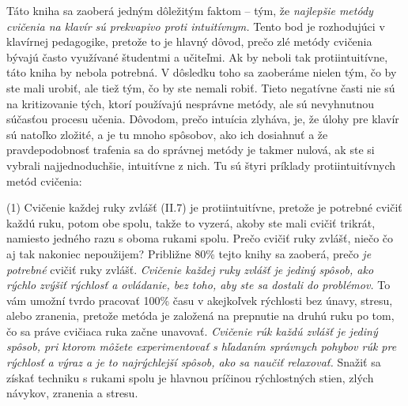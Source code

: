 Táto kniha sa zaoberá jedným dôležitým faktom – tým, že \emph{najlepšie metódy cvičenia na klavír sú prekvapivo proti intuitívnym.} Tento bod je rozhodujúci v klavírnej pedagogike, pretože to je hlavný dôvod, prečo zlé metódy cvičenia bývajú často využívané študentmi a učiteľmi. Ak by neboli tak protiintuitívne, táto kniha by nebola potrebná. V dôsledku toho sa zaoberáme nielen tým, čo by ste mali urobiť, ale tiež tým, čo by ste nemali robiť. Tieto negatívne časti nie sú na kritizovanie tých, ktorí používajú nesprávne metódy, ale sú nevyhnutnou súčasťou procesu učenia. Dôvodom, prečo intuícia zlyháva, je, že úlohy pre klavír sú natoľko zložité, a je tu mnoho spôsobov, ako ich dosiahnuť a že pravdepodobnosť trafenia sa do správnej metódy je takmer nulová, ak ste si vybrali najjednoduchšie, intuitívne z nich. Tu sú štyri príklady protiintuitívnych metód cvičenia:

(1) Cvičenie každej ruky zvlášť (II.7) je protiintuitívne, pretože je potrebné cvičiť každú ruku, potom obe spolu, takže to vyzerá, akoby ste mali cvičiť trikrát, namiesto jedného razu s oboma rukami spolu. Prečo cvičiť ruky zvlášť, niečo čo aj tak nakoniec nepoužijem? Približne 80\% tejto knihy sa zaoberá, prečo \textit{je potrebné} cvičiť ruky zvlášť. \emph{Cvičenie každej ruky zvlášť je jediný spôsob, ako rýchlo zvýšiť rýchlosť a ovládanie, bez toho, aby ste sa dostali do problémov.} To vám umožní tvrdo pracovať 100\% času v akejkoľvek rýchlosti bez únavy, stresu, alebo zranenia, pretože metóda je založená na prepnutie na druhú ruku po tom, čo sa práve cvičiaca ruka začne unavovať. \emph{Cvičenie rúk každú zvlášť je jediný spôsob, pri ktorom môžete experimentovať s hľadaním správnych pohybov rúk pre rýchlosť a výraz a je to najrýchlejší spôsob, ako sa naučiť relaxovať.} Snažiť sa získať techniku s rukami spolu je hlavnou príčinou rýchlostných stien, zlých návykov, zranenia a stresu.

